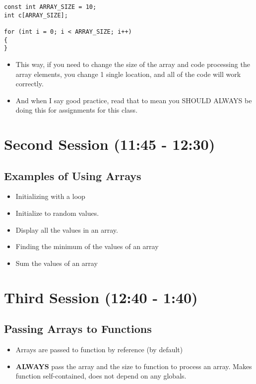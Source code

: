 \documentclass[11pt]{article}
\begin{document}
\begin{verbatim}
const int ARRAY_SIZE = 10;
int c[ARRAY_SIZE];

for (int i = 0; i < ARRAY_SIZE; i++)
{
}
\end{verbatim}

\begin{itemize}
\item This way, if you need to change the size of the array and code
processing the array elements, you change 1 single location, and all
of the code will work correctly.
\item And when I say good practice, read that to mean you SHOULD ALWAYS
be doing this for assignments for this class.
\end{itemize}
\section{Second Session (11:45 - 12:30)}
\label{sec-2}
\subsection{Examples of Using Arrays}
\label{sec-2-1}
\begin{itemize}
\item Initializing with a loop
\item Initialize to random values.
\item Display all the values in an array.
\item Finding the minimum of the values of an array
\item Sum the values of an array
\end{itemize}
\section{Third Session (12:40 - 1:40)}
\label{sec-3}
\subsection{Passing Arrays to Functions}
\label{sec-3-1}
\begin{itemize}
\item Arrays are passed to function by reference (by default)
\item \textbf{ALWAYS} pass the array and the size to function to process an
array.  Makes function self-contained, does not depend on any
globals.
\end{itemize}
\end{document}
